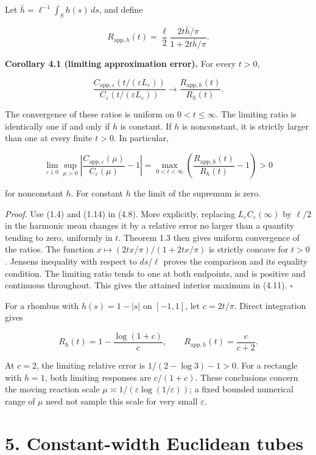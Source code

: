 \documentclass[11pt]{article}
\begin{document}
Let \(\bar h=\ell^{-1}\int_S h(s)\,ds\), and define

\[
R_{\mathrm{app},h}(t)=\frac\ell2
       \frac{2t\bar h/\pi}{1+2t\bar h/\pi}.
\tag{4.9}
\]

\textbf{Corollary 4.1 (limiting approximation error).} For every
\(t>0\),

\[
\frac{C_{\mathrm{app},\varepsilon}(t/(\varepsilon L_\varepsilon))}
 {C_\varepsilon(t/(\varepsilon L_\varepsilon))}
 \longrightarrow\frac{R_{\mathrm{app},h}(t)}{R_h(t)}.
\tag{4.10}
\]

The convergence of these ratios is uniform on \(0<t\le\infty\). The
limiting ratio is identically one if and only if \(h\) is constant. If
\(h\) is nonconstant, it is strictly larger than one at every finite
\(t>0\). In particular,

\[
\lim_{\varepsilon\downarrow0}\sup_{\mu>0}
 \left|\frac{C_{\mathrm{app},\varepsilon}(\mu)}{C_\varepsilon(\mu)}-1\right|
 =\max_{0<t<\infty}
       \left(\frac{R_{\mathrm{app},h}(t)}{R_h(t)}-1\right)>0
\tag{4.11}
\]

for nonconstant \(h\). For constant \(h\) the limit of the supremum is
zero.

\emph{Proof.} Use (1.4) and (1.14) in (4.8). More explicitly, replacing
\(L_\varepsilon C_\varepsilon(\infty)\) by \(\ell/2\) in the harmonic
mean changes it by a relative error no larger than a quantity tending to
zero, uniformly in \(t\). Theorem 1.3 then gives uniform convergence of
the ratios. The function \(x\mapsto (2tx/\pi)/(1+2tx/\pi)\) is strictly
concave for \(t>0\). Jensen\textquotesingle s inequality with respect to
\(ds/\ell\) proves the comparison and its equality condition. The
limiting ratio tends to one at both endpoints, and is positive and
continuous throughout. This gives the attained interior maximum in
(4.11). \(\square\)

For a rhombus with \(h(s)=1-|s|\) on \([-1,1]\), let \(c=2t/\pi\).
Direct integration gives

\[
R_h(t)=1-\frac{\log(1+c)}c,
\qquad R_{\mathrm{app},h}(t)=\frac{c}{c+2}.
\tag{4.12}
\]

At \(c=2\), the limiting relative error is \(1/(2-\log3)-1>0\). For a
rectangle with \(h=1\), both limiting responses are \(c/(1+c)\). These
conclusions concern the moving reaction scale
\(\mu\asymp1/(\varepsilon\log(1/\varepsilon))\); a fixed bounded
numerical range of \(\mu\) need not sample this scale for very small
\(\varepsilon\).

\section{5. Constant-width Euclidean
tubes}\label{constant-width-euclidean-tubes}
\end{document}
